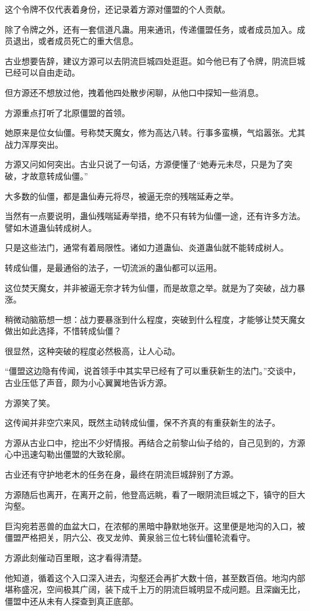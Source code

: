 \begin{this_body}
这个令牌不仅代表着身份，还记录着方源对僵盟的个人贡献。

除了令牌之外，还有一套信道凡蛊。用来通讯，传递僵盟任务，或者成员加入。成员退出，或者成员死亡的重大信息。

古业想要告辞，建议方源可以去阴流巨城四处逛逛。如今他已有了令牌，阴流巨城已经可以自由走动。

但方源还不想放过他，拽着他四处散步闲聊，从他口中探知一些消息。

方源重点打听了北原僵盟的首领。

她原来是位女仙僵。号称焚天魔女，修为高达八转。行事多蛮横，气焰嚣张。尤其战力浑厚突出。

方源又问如何突出。古业只说了一句话，方源便懂了“她寿元未尽，只是为了突破，才故意转成仙僵。”

大多数的仙僵，都是蛊仙寿元将尽，被逼无奈的残喘延寿之举。

当然有一点要说明，蛊仙残喘延寿举措，绝不只有转为仙僵一途，还有许多方法。譬如木道蛊仙转成树人。

只是这些法门，通常有着局限性。诸如力道蛊仙、炎道蛊仙就不能转成树人。

转成仙僵，是最通俗的法子，一切流派的蛊仙都可以运用。

这位焚天魔女，并非被逼无奈才转为仙僵，而是故意之举。就是为了突破，战力暴涨。

稍微动脑筋想一想：战力要暴涨到什么程度，突破到什么程度，才能够让焚天魔女做出如此选择，不惜转成仙僵？

很显然，这种突破的程度必然极高，让人心动。

“僵盟这边隐有传闻，说首领手中其实早已经有了可以重获新生的法门。”交谈中，古业压低了声音，颇为小心翼翼地告诉方源。

方源笑了笑。

这传闻并非空穴来风，既然主动转成仙僵，保不齐真的有重获新生的法子。

方源从古业口中，挖出不少好情报。再结合之前黎山仙子给的，自己见到的，方源心中迅速勾勒出僵盟的大致轮廓。

古业还有守护地老木的任务在身，最终在阴流巨城辞别了方源。

方源随后也离开，在离开之前，他登高远眺，看了一眼阴流巨城之下，镇守的巨大沟壑。

巨沟宛若恶兽的血盆大口，在浓郁的黑暗中静默地张开。这里便是地沟的入口，被僵盟严格把关，阴六公、夜叉龙帅、黄泉翁三位七转仙僵轮流看守。

方源此刻催动百里眼，这才看得清楚。

他知道，循着这个入口深入进去，沟壑还会再扩大数十倍，甚至数百倍。地沟内部堪称盛况，空间极其广阔，装下成千上万的阴流巨城明显不成问题。且深幽无比，僵盟中还从未有人探查到真正底部。


\end{this_body}
